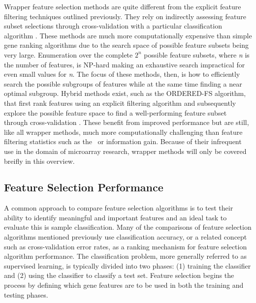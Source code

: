 
Wrapper feature selection methods are quite different from the explicit feature
filtering techniques outlined previously.  They rely on indirectly
assessing feature subset selections through cross-validation with a particular
classification algorithm \cite{Berrar_2003}.  These methods are much more
computationally expensive than simple gene ranking algorithms due to the search
space of possible feature subsets being very large. Enumeration over the
complete $2^n$ possible feature subsets, where \emph{n} is the number of
features, is NP-hard making an exhaustive search impractical for even small
values for \emph{n}. The focus of these methods, then, is how to efficiently search
the possible subgroups of features while at the same time finding a near
optimal subgroup.  Hybrid methods exist, such as the ORDERED-FS algorithm, that
first rank features using an explicit filtering algorithm and subsequently
explore the possible feature space to find a well-performing feature subset
through cross-validation \cite{Ng_1998}. These benefit from improved
performance but are still, like all wrapper methods, much more computationally
challenging than feature filtering statistics such as the \ttest\ or information
gain. Because of their infrequent use in the domain of microarray research,
wrapper methods will only be covered breifly in this overview.

\subsection{Feature Selection Performance}

A common approach to compare feature selection algorithms is to test their
ability to identify meaningful and important features and an ideal task to
evaluate this is sample classification.  Many of the comparisons of feature
selection algorithms mentioned previously use classification accuracy, or a
related concept such as cross-validation error rates, as a ranking mechanism
for feature selection algorithm performance.  The classification problem, more
generally referred to as supervised learning, is typically divided into two
phases: (1) training the classifier and (2) using the classifier to classify
a test set.  Feature selection begins the process by defining which gene
features are to be used in both the training and testing phases.


